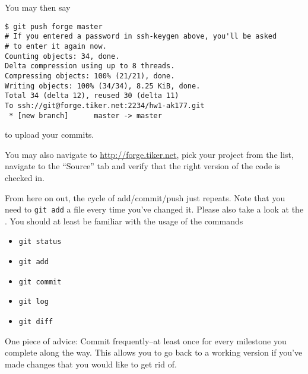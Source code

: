 \documentclass[11pt]{article}
\begin{document}
You may then say
\begin{lstlisting}
$ git push forge master
# If you entered a password in ssh-keygen above, you'll be asked
# to enter it again now.
Counting objects: 34, done.
Delta compression using up to 8 threads.
Compressing objects: 100% (21/21), done.
Writing objects: 100% (34/34), 8.25 KiB, done.
Total 34 (delta 12), reused 30 (delta 11)
To ssh://git@forge.tiker.net:2234/hw1-ak177.git
 * [new branch]      master -> master
\end{lstlisting}
to upload your commits.

You may also navigate to \url{http://forge.tiker.net}, pick your
project from the list, navigate to the ``Source'' tab and verify that
the right version of the code is checked in.

From here on out, the cycle of add/commit/push just repeats. Note that
you need to \texttt{git add} a file every time you've changed it.
Please also take a look at the
. You should at least be familiar with the usage of the
commands
\begin{itemize}
  \item \texttt{git status}
  \item \texttt{git add}
  \item \texttt{git commit}
  \item \texttt{git log}
  \item \texttt{git diff}
\end{itemize}
One piece of advice: Commit frequently--at least once
for every milestone you complete along the way. This allows you
to go back to a working version if you've made changes that you would
like to get rid of.
\end{document}
